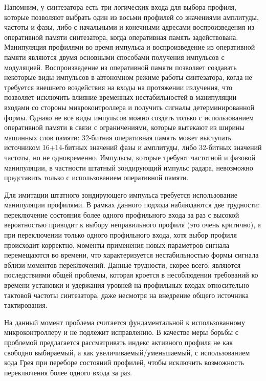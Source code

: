 \documentclass{report}
\begin{document}
Напомним, у синтезатора есть три логических входа для выбора профиля, которые позволяют выбрать один из восьми профилей со значениями амплитуды, частоты и фазы, либо с начальными и конечными адресами воспроизведения из оперативной памяти синтезатора, когда оперативная память задействована. Манипуляция профилями во время импульса и воспроизведение из оперативной памяти являются двумя основными способами получения импульсов с модуляцией. Воспроизведение из оперативной памяти позволяет создавать некоторые виды импульсов в автономном режиме работы синтезатора, когда не требуется внешнего воздействия на входы на протяжении излучения, что позволяет исключить влияние временных нестабильностей в манипуляции входами со стороны микроконтроллера и получить сигналы детерминированной формы. Однако не все виды импульсов можно создать только с использованием оперативной памяти в связи с ограничениями, которые вытекают из ширины машинных слов памяти: 32-битная оперативная память может выступать источником 16+14-битных значений фазы и амплитуды, либо 32-битных значений частоты, но не одновременно. Импульсы, которые требуют частотной и фазовой манипуляции, в частности штатный зондирующий импульс радара, невозможно представить только с использованием оперативной памяти.

Для имитации штатного зондирующего импульса требуется использование манипуляции профилями. В рамках данного подхода наблюдаются две трудности: переключение состояния более одного профильного входа за раз с высокой вероятностью приводит к выбору неправильного профиля (это очень критично), а при переключении только одного профильного входа, хотя выбор профиля происходит корректно, моменты применения новых параметров сигнала перемещаются во времени, что характеризуется нестабильностью формы сигнала вблизи моментов переключений. Данные трудности, скорее всего, являются последствиями общей проблемы, которая кроется в несоблюдении требований ко времени установки и удержания уровней на профильных входах относительно тактовой частоты синтезатора, даже несмотря на внедрение общего источника тактирования.

На данный момент проблема считается фундаментальной к использованному микроконтроллеру и не подлежит исправлению. В качестве меры борьбы с проблемой предлагается рассматривать индекс активного профиля не как свободно выбираемый, а как увеличиваемый/уменьшаемый, с использованием кода Грея при переборе состояний профилей, чтобы исключить возможность переключения более одного входа за раз.
\end{document}
